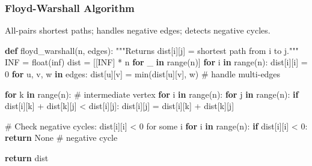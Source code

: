 \documentclass[11pt]{article}
\newenvironment{Shaded}{\begin{snugshade}}{\end{snugshade}}
\newcommand{\BuiltInTok}[1]{\textcolor[rgb]{0.50,0.55,0.55}{#1}}
\newcommand{\CommentTok}[1]{\textcolor[rgb]{0.48,0.49,0.49}{#1}}
\newcommand{\ControlFlowTok}[1]{\textcolor[rgb]{0.99,0.74,0.29}{\textbf{#1}}}
\newcommand{\DecValTok}[1]{\textcolor[rgb]{0.96,0.45,0.00}{#1}}
\newcommand{\KeywordTok}[1]{\textcolor[rgb]{0.81,0.81,0.76}{\textbf{#1}}}
\newcommand{\NormalTok}[1]{\textcolor[rgb]{0.81,0.81,0.76}{#1}}
\newcommand{\OperatorTok}[1]{\textcolor[rgb]{0.81,0.81,0.76}{#1}}
\newcommand{\StringTok}[1]{\textcolor[rgb]{0.96,0.31,0.31}{#1}}
\newcommand{\VariableTok}[1]{\textcolor[rgb]{0.15,0.68,0.68}{#1}}
\begin{document}
\subsubsection{Floyd-Warshall Algorithm}\label{floyd-warshall-algorithm}

All-pairs shortest paths; handles negative edges; detects negative cycles.


\begin{Shaded}
\begin{Highlighting}[]
\KeywordTok{def}\NormalTok{ floyd\_warshall(n, edges):}
    \CommentTok{"""Returns dist[i][j] = shortest path from i to j."""}
\NormalTok{    INF }\OperatorTok{=} \BuiltInTok{float}\NormalTok{(}\StringTok{\textquotesingle{}inf\textquotesingle{}}\NormalTok{)}
\NormalTok{    dist }\OperatorTok{=}\NormalTok{ [[INF] }\OperatorTok{*}\NormalTok{ n }\ControlFlowTok{for}\NormalTok{ \_ }\KeywordTok{in} \BuiltInTok{range}\NormalTok{(n)]}
    \ControlFlowTok{for}\NormalTok{ i }\KeywordTok{in} \BuiltInTok{range}\NormalTok{(n):}
\NormalTok{        dist[i][i] }\OperatorTok{=} \DecValTok{0}
    \ControlFlowTok{for}\NormalTok{ u, v, w }\KeywordTok{in}\NormalTok{ edges:}
\NormalTok{        dist[u][v] }\OperatorTok{=} \BuiltInTok{min}\NormalTok{(dist[u][v], w)   }\CommentTok{\# handle multi{-}edges}

    \ControlFlowTok{for}\NormalTok{ k }\KeywordTok{in} \BuiltInTok{range}\NormalTok{(n):          }\CommentTok{\# intermediate vertex}
        \ControlFlowTok{for}\NormalTok{ i }\KeywordTok{in} \BuiltInTok{range}\NormalTok{(n):}
            \ControlFlowTok{for}\NormalTok{ j }\KeywordTok{in} \BuiltInTok{range}\NormalTok{(n):}
                \ControlFlowTok{if}\NormalTok{ dist[i][k] }\OperatorTok{+}\NormalTok{ dist[k][j] }\OperatorTok{\textless{}}\NormalTok{ dist[i][j]:}
\NormalTok{                    dist[i][j] }\OperatorTok{=}\NormalTok{ dist[i][k] }\OperatorTok{+}\NormalTok{ dist[k][j]}

    \CommentTok{\# Check negative cycles: dist[i][i] \textless{} 0 for some i}
    \ControlFlowTok{for}\NormalTok{ i }\KeywordTok{in} \BuiltInTok{range}\NormalTok{(n):}
        \ControlFlowTok{if}\NormalTok{ dist[i][i] }\OperatorTok{\textless{}} \DecValTok{0}\NormalTok{:}
            \ControlFlowTok{return} \VariableTok{None}  \CommentTok{\# negative cycle}

    \ControlFlowTok{return}\NormalTok{ dist}
\end{Highlighting}
\end{Shaded}
\end{document}
